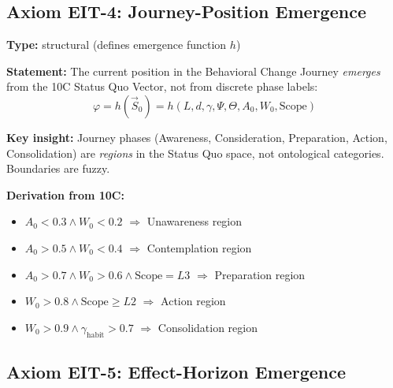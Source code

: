 \subsection{Axiom EIT-4: Journey-Position Emergence}
\label{sec:ie-axiom-4}

\begin{tcolorbox}[colback=blue!5!white, colframe=blue!75!black,
    title=\textbf{Axiom EIT-4: Journey-Position Emergence}]

\textbf{Type:} structural (defines emergence function $h$)

\textbf{Statement:} The current position in the Behavioral Change Journey \textit{emerges} from the 10C Status Quo Vector, not from discrete phase labels:
\begin{equation}
\boxed{\varphi = h(\vec{S}_0) = h(L, d, \gamma, \Psi, \Theta, A_0, W_0, \text{Scope})}
\label{eq:ie-journey-emergence}
\end{equation}

\textbf{Key insight:} Journey phases (Awareness, Consideration, Preparation, Action, Consolidation) are \textit{regions} in the Status Quo space, not ontological categories. Boundaries are fuzzy.

\textbf{Derivation from 10C:}
\begin{itemize}[nosep]
    \item $A_0 < 0.3 \land W_0 < 0.2$ $\Rightarrow$ Unawareness region
    \item $A_0 > 0.5 \land W_0 < 0.4$ $\Rightarrow$ Contemplation region
    \item $A_0 > 0.7 \land W_0 > 0.6 \land \text{Scope} = L3$ $\Rightarrow$ Preparation region
    \item $W_0 > 0.8 \land \text{Scope} \geq L2$ $\Rightarrow$ Action region
    \item $W_0 > 0.9 \land \gamma_{\text{habit}} > 0.7$ $\Rightarrow$ Consolidation region
\end{itemize}
\end{tcolorbox}

\subsection{Axiom EIT-5: Effect-Horizon Emergence}
\label{sec:ie-axiom-5}

